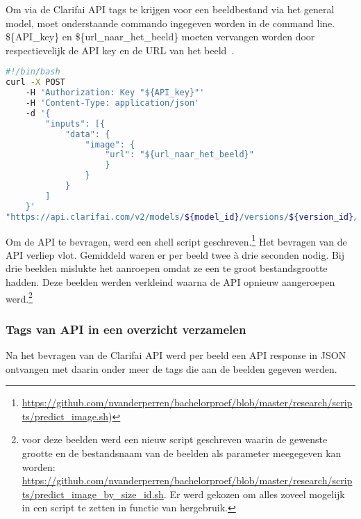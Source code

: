 Om via de Clarifai API tags te krijgen voor een beeldbestand via het general model, moet onderstaande commando ingegeven worden in de command line. \$\{API\_key\} en \$\{url\_naar\_het\_beeld\} moeten vervangen worden door respectievelijk de API key en de URL van het beeld~\autocite{ClarifaiAPI}.


\begin{lstlisting}[language=bash,caption=bash commando om een beeld door Clarifai te laten taggen.]
#!/bin/bash
curl -X POST
    -H 'Authorization: Key "${API_key}"'
    -H 'Content-Type: application/json'
    -d '{
        "inputs": [{
            "data": {
                "image": { 
                    "url": "${url_naar_het_beeld}"
                    }
                }
            }
        ]
    }'
"https://api.clarifai.com/v2/models/${model_id}/versions/${version_id}/outputs"
\end{lstlisting}

Om de API te bevragen, werd een shell script geschreven.\footnote{\url{https://github.com/nvanderperren/bachelorproef/blob/master/research/scripts/predict_image.sh})} Het bevragen van de API verliep vlot. Gemiddeld waren er per beeld twee à drie seconden nodig. Bij drie beelden mislukte het aanroepen omdat ze een te groot bestandsgrootte hadden. Deze beelden werden verkleind waarna de API opnieuw aangeroepen werd.\footnote{voor deze beelden werd een nieuw script geschreven waarin de gewenste grootte en de bestandsnaam van de beelden als parameter meegegeven kan worden: \url{https://github.com/nvanderperren/bachelorproef/blob/master/research/scripts/predict_image_by_size_id.sh}. Er werd gekozen om alles zoveel mogelijk in een script te zetten in functie van hergebruik.}

\subsubsection{Tags van API in een overzicht verzamelen}

Na het bevragen van de Clarifai API werd per beeld een API response in JSON ontvangen met daarin onder meer de tags die aan de beelden gegeven werden.

